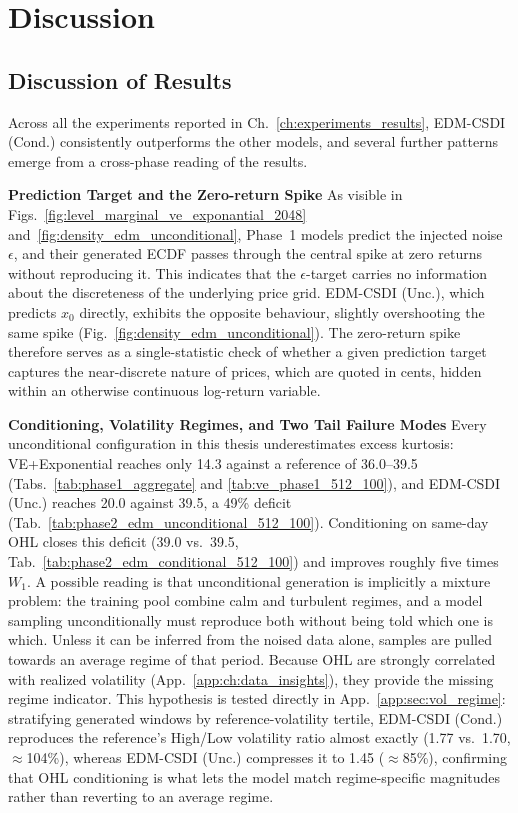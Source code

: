 \chapter{Discussion}
\label{ch:discussion}

\section{Discussion of Results}
\label{sec:discussion_results}

Across all the experiments reported in Ch.\ \ref{ch:experiments_results}, EDM-CSDI (Cond.) consistently outperforms the other models, and several further patterns emerge from a cross-phase reading of the results.

\textbf{Prediction Target and the Zero-return Spike} \quad 
As visible in Figs.\ \ref{fig:level_marginal_ve_exponantial_2048} 
and\ \ref{fig:density_edm_unconditional}, Phase~1 models predict the 
injected noise $\epsilon$, and their generated ECDF passes through the 
central spike at zero returns without reproducing it. This indicates that 
the $\epsilon$-target carries no information about the discreteness of the 
underlying price grid. EDM-CSDI (Unc.), which predicts $x_0$ directly, 
exhibits the opposite behaviour, slightly overshooting the same spike 
(Fig.\ \ref{fig:density_edm_unconditional}). The zero-return spike therefore 
serves as a single-statistic check of whether a given prediction target 
captures the near-discrete nature of prices, which are quoted in cents, hidden within an otherwise continuous log-return variable.

\textbf{Conditioning, Volatility Regimes, and Two Tail Failure Modes} \quad Every unconditional configuration in this thesis underestimates excess kurtosis: VE+Exponential reaches only 14.3 against a reference of 36.0--39.5 (Tabs.\ \ref{tab:phase1_aggregate} and \ref{tab:ve_phase1_512_100}), and EDM-CSDI (Unc.) reaches 20.0 against 39.5, a 49\% deficit (Tab.\ \ref{tab:phase2_edm_unconditional_512_100}). Conditioning on same-day OHL closes this deficit (39.0 vs.\ 39.5, Tab.\ \ref{tab:phase2_edm_conditional_512_100}) and improves roughly five times \(W_1\). A possible reading is that unconditional generation is implicitly a mixture problem: the training pool combine calm and turbulent regimes, and a model sampling unconditionally must reproduce both without being told which one is which. Unless it can be inferred from the noised data alone, samples are pulled towards an average regime of that period. Because OHL are strongly correlated with realized volatility (App.\ \ref{app:ch:data_insights}), they provide the missing regime indicator. This hypothesis is tested directly in App.\ \ref{app:sec:vol_regime}: stratifying generated windows by reference-volatility tertile, EDM-CSDI (Cond.) reproduces the reference's High/Low volatility ratio almost exactly (1.77 vs.\ 1.70, \(\approx\)104\%), whereas EDM-CSDI (Unc.) compresses it to 1.45 (\(\approx\)85\%), confirming that OHL conditioning is what lets the model match regime-specific magnitudes rather than reverting to an average regime.

